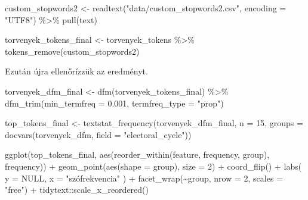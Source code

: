 \documentclass[
]{book}
\newenvironment{Shaded}{\begin{snugshade}}{\end{snugshade}}
\newcommand{\AttributeTok}[1]{\textcolor[rgb]{0.77,0.63,0.00}{#1}}
\newcommand{\ConstantTok}[1]{\textcolor[rgb]{0.00,0.00,0.00}{#1}}
\newcommand{\DecValTok}[1]{\textcolor[rgb]{0.00,0.00,0.81}{#1}}
\newcommand{\FloatTok}[1]{\textcolor[rgb]{0.00,0.00,0.81}{#1}}
\newcommand{\FunctionTok}[1]{\textcolor[rgb]{0.00,0.00,0.00}{#1}}
\newcommand{\NormalTok}[1]{#1}
\newcommand{\OtherTok}[1]{\textcolor[rgb]{0.56,0.35,0.01}{#1}}
\newcommand{\SpecialCharTok}[1]{\textcolor[rgb]{0.00,0.00,0.00}{#1}}
\newcommand{\StringTok}[1]{\textcolor[rgb]{0.31,0.60,0.02}{#1}}
\begin{document}
\begin{Shaded}
\begin{Highlighting}[]
\NormalTok{custom\_stopwords2 }\OtherTok{\textless{}{-}} \FunctionTok{readtext}\NormalTok{(}\StringTok{"data/custom\_stopwords2.csv"}\NormalTok{, }\AttributeTok{encoding =} \StringTok{"UTF8"}\NormalTok{) }\SpecialCharTok{\%\textgreater{}\%}
  \FunctionTok{pull}\NormalTok{(text)}

\NormalTok{torvenyek\_tokens\_final }\OtherTok{\textless{}{-}}\NormalTok{ torvenyek\_tokens }\SpecialCharTok{\%\textgreater{}\%}
  \FunctionTok{tokens\_remove}\NormalTok{(custom\_stopwords2)}
\end{Highlighting}
\end{Shaded}

Ezután újra ellenőrízzük az eredményt.

\begin{Shaded}
\begin{Highlighting}[]
\NormalTok{torvenyek\_dfm\_final }\OtherTok{\textless{}{-}} \FunctionTok{dfm}\NormalTok{(torvenyek\_tokens\_final) }\SpecialCharTok{\%\textgreater{}\%} \FunctionTok{dfm\_trim}\NormalTok{(}\AttributeTok{min\_termfreq =} \FloatTok{0.001}\NormalTok{, }
    \AttributeTok{termfreq\_type =} \StringTok{"prop"}\NormalTok{)}

\NormalTok{top\_tokens\_final }\OtherTok{\textless{}{-}} \FunctionTok{textstat\_frequency}\NormalTok{(torvenyek\_dfm\_final, }\AttributeTok{n =} \DecValTok{15}\NormalTok{, }\AttributeTok{groups =} \FunctionTok{docvars}\NormalTok{(torvenyek\_dfm, }
    \AttributeTok{field =} \StringTok{"electoral\_cycle"}\NormalTok{))}
\end{Highlighting}
\end{Shaded}

\begin{Shaded}
\begin{Highlighting}[]
\FunctionTok{ggplot}\NormalTok{(top\_tokens\_final, }\FunctionTok{aes}\NormalTok{(}\FunctionTok{reorder\_within}\NormalTok{(feature, frequency, group), frequency)) }\SpecialCharTok{+}
  \FunctionTok{geom\_point}\NormalTok{(}\FunctionTok{aes}\NormalTok{(}\AttributeTok{shape =}\NormalTok{ group), }\AttributeTok{size =} \DecValTok{2}\NormalTok{) }\SpecialCharTok{+}
  \FunctionTok{coord\_flip}\NormalTok{() }\SpecialCharTok{+}
  \FunctionTok{labs}\NormalTok{(}
    \AttributeTok{y =} \ConstantTok{NULL}\NormalTok{,}
    \AttributeTok{x =} \StringTok{"szófrekvencia"}
\NormalTok{  ) }\SpecialCharTok{+}
  \FunctionTok{facet\_wrap}\NormalTok{(}\SpecialCharTok{\textasciitilde{}}\NormalTok{group, }\AttributeTok{nrow =} \DecValTok{2}\NormalTok{, }\AttributeTok{scales =} \StringTok{"free"}\NormalTok{) }\SpecialCharTok{+}
\NormalTok{  tidytext}\SpecialCharTok{::}\FunctionTok{scale\_x\_reordered}\NormalTok{()}
\end{Highlighting}
\end{Shaded}
\end{document}
